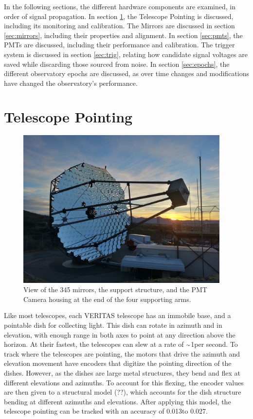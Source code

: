 In the following sections, the different hardware components are examined, in order of signal propagation.
In section \ref{sec:telpoint}, the Telescope Pointing is discussed, including its monitoring and calibration.
The Mirrors are discussed in section \ref{sec:mirrors}, including their properties and alignment.
In section \ref{sec:pmts}, the PMTs are discussed, including their performance and calibration.
The trigger system is discussed in section \ref{sec:trig}, relating how candidate signal voltages are saved while discarding those sourced from noise.
In section \ref{sec:epochs}, the different observatory epochs are discussed, as over time changes and modifications have changed the observatory's performance.


\section{Telescope Pointing}\label{sec:telpoint}

\begin{figure}[h]
  \begin{center}
    \includegraphics[width=0.95\textwidth]{images/single_telescope}
    \caption[Single Veritas Telescope]{View of the 345 mirrors, the support structure, and the PMT Camera housing at the end of the four supporting arms.}\label{fig:davcottel}
  \end{center}
\end{figure}

Like most telescopes, each VERITAS telescope has an immobile base, and a pointable dish for collecting light.
This dish can rotate in azimuth and in elevation, with enough range in both axes to point at any direction above the horizon.
At their fastest, the telescopes can slew at a rate of $\nicetilde$1\degree per second.
To track where the telescopes are pointing, the motors that drive the azimuth and elevation movement have encoders that digitize the pointing direction of the dishes.
However, as the dishes are large metal structures, they bend and flex at different elevations and azimuths.
To account for this flexing, the encoder values are then given to a structural model (??), which accounts for the dish structure bending at different azimuths and elevations.
After applying this model, the telescope pointing can be tracked with an accuracy of 0.013\degree to 0.027\degree \cite{Veritas_Detector}.

